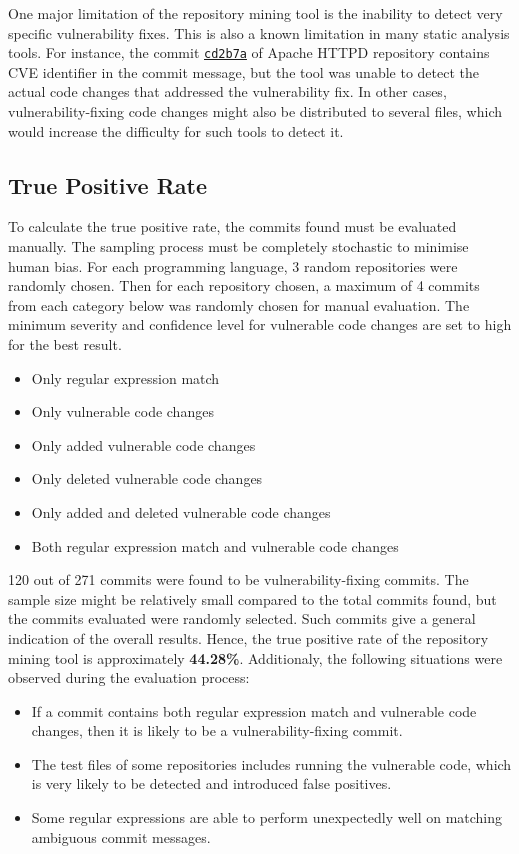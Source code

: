 \documentclass[12pt, a4paper]{report}
\begin{document}
One major limitation of the repository mining tool is the inability to detect very specific
vulnerability fixes. This is also a known limitation in many static analysis tools. For instance,
the commit \href{https://github.com/apache/httpd/commit/cd2b7a}{\color{blue}\texttt{cd2b7a}} of
Apache HTTPD repository contains CVE identifier in the commit message, but the tool was unable to
detect the actual code changes that addressed the vulnerability fix. In other cases,
vulnerability-fixing code changes might also be distributed to several files, which would increase
the difficulty for such tools to detect it.

\subsection{True Positive Rate}
To calculate the true positive rate, the commits found must be evaluated manually. The sampling
process must be completely stochastic to minimise human bias. For each programming language, 3
random repositories were randomly chosen. Then for each repository chosen, a maximum of 4 commits
from each category below was randomly chosen for manual evaluation. The minimum severity and
confidence level for vulnerable code changes are set to high for the best result.
\begin{itemize}
  \item Only regular expression match
  \item Only vulnerable code changes
  \item Only added vulnerable code changes
  \item Only deleted vulnerable code changes
  \item Only added and deleted vulnerable code changes
  \item Both regular expression match and vulnerable code changes
\end{itemize}
120 out of 271 commits were found to be vulnerability-fixing commits. The sample size might be
relatively small compared to the total commits found, but the commits evaluated were randomly
selected. Such commits give a general indication of the overall results. Hence, the true positive
rate of the repository mining tool is approximately \textbf{44.28\%}. Additionaly, the following
situations were observed during the evaluation process:

\begin{itemize}
  \item If a commit contains both regular expression match and vulnerable code changes, then it is
  likely to be a vulnerability-fixing commit.
  \item The test files of some repositories includes running the vulnerable code, which is very
  likely to be detected and introduced false positives.
  \item Some regular expressions are able to perform unexpectedly well on matching ambiguous commit
  messages.
\end{itemize}
\end{document}
